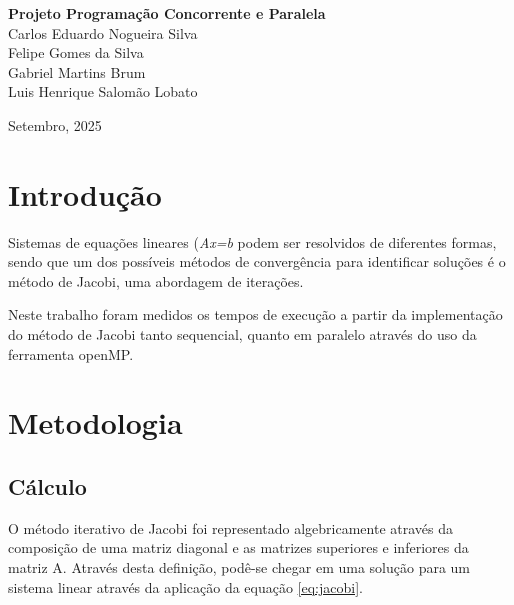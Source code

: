 \documentclass{article}
\begin{document}
\begin{titlepage}
	\begin{center}
	
	\vspace{115pt}
    \textbf{\Huge{Projeto Programação Concorrente e Paralela}}\\
        
	\vspace{115pt}
    Carlos Eduardo Nogueira Silva \\
    Felipe Gomes da Silva \\
    Gabriel Martins Brum \\
    Luis Henrique Salomão Lobato \\
	\end{center}
	
	\vspace{1cm}
	\begin{center}
		\vspace{\fill}
    \large{Setembro, 2025} 
	\end{center}
\end{titlepage}
\date{September 2025}




\section{Introdução}

Sistemas  de equações lineares (\textit{Ax=b} podem ser resolvidos de diferentes formas, sendo que um dos possíveis métodos de convergência para identificar soluções é o método de Jacobi, uma abordagem de iterações. 

Neste trabalho foram medidos os tempos de execução a partir da implementação do método de Jacobi tanto sequencial, quanto em paralelo através do uso da ferramenta openMP. 

\section{Metodologia}
\subsection{Cálculo}
O método iterativo de Jacobi foi representado algebricamente através da composição de uma matriz diagonal e as matrizes superiores e inferiores da matriz A. Através desta definição, podê-se chegar em uma solução para um sistema linear através da aplicação da equação \ref{eq:jacobi}. 
\end{document}
